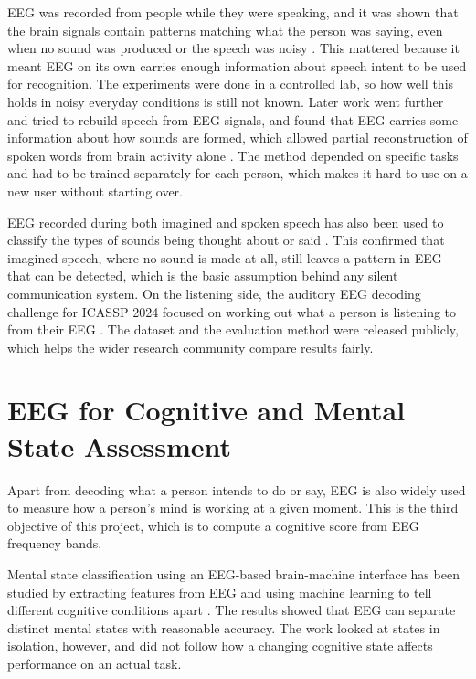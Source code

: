 EEG was recorded from people while they were speaking, and it was shown that the brain
signals contain patterns matching what the person was saying, even when no sound was
produced or the speech was noisy \cite{krishna2019nospeech}. This mattered because it meant
EEG on its own carries enough information about speech intent to be used for recognition.
The experiments were done in a controlled lab, so how well this holds in noisy everyday
conditions is still not known. Later work went further and tried to rebuild speech from EEG
signals, and found that EEG carries some information about how sounds are formed, which
allowed partial reconstruction of spoken words from brain activity alone
\cite{krishna2020eeg}. The method depended on specific tasks and had to be trained
separately for each person, which makes it hard to use on a new user without starting over.

EEG recorded during both imagined and spoken speech has also been used to classify the
types of sounds being thought about or said \cite{zhao2015phonological}. This confirmed
that imagined speech, where no sound is made at all, still leaves a pattern in EEG that can
be detected, which is the basic assumption behind any silent communication system. On the
listening side, the auditory EEG decoding challenge for ICASSP 2024 focused on working out
what a person is listening to from their EEG \cite{bollens2025auditory}. The dataset and the
evaluation method were released publicly, which helps the wider research community compare
results fairly.

\section{EEG for Cognitive and Mental State Assessment}

Apart from decoding what a person intends to do or say, EEG is also widely used to measure
how a person's mind is working at a given moment. This is the third objective of this
project, which is to compute a cognitive score from EEG frequency bands.

Mental state classification using an EEG-based brain-machine interface has been studied by
extracting features from EEG and using machine learning to tell different cognitive
conditions apart \cite{bird2018mental}. The results showed that EEG can separate distinct
mental states with reasonable accuracy. The work looked at states in isolation, however,
and did not follow how a changing cognitive state affects performance on an actual task.

